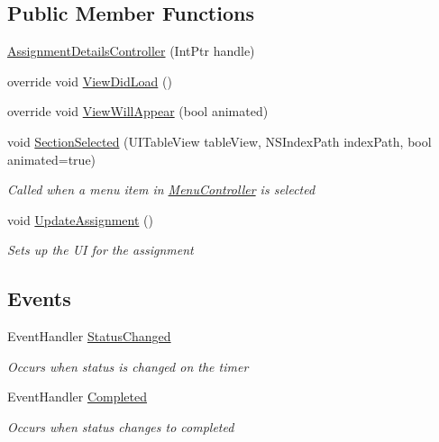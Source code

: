 \subsection*{Public Member Functions}
\begin{DoxyCompactItemize}
\item 
\hyperlink{class_field_service_1_1i_o_s_1_1_assignment_details_controller_a06faa2d417819881ae24d85e6d36aef0}{Assignment\+Details\+Controller} (Int\+Ptr handle)
\item 
override void \hyperlink{class_field_service_1_1i_o_s_1_1_assignment_details_controller_a4ee2c39c5958c7a07bcf1f37e794e79b}{View\+Did\+Load} ()
\item 
override void \hyperlink{class_field_service_1_1i_o_s_1_1_assignment_details_controller_afa9a33b6f985b8f081942c33626387e1}{View\+Will\+Appear} (bool animated)
\item 
void \hyperlink{class_field_service_1_1i_o_s_1_1_assignment_details_controller_a9142dec65b3188871903128680ad9a90}{Section\+Selected} (U\+I\+Table\+View table\+View, N\+S\+Index\+Path index\+Path, bool animated=true)
\begin{DoxyCompactList}\small\item\em Called when a menu item in \hyperlink{class_field_service_1_1i_o_s_1_1_menu_controller}{Menu\+Controller} is selected \end{DoxyCompactList}\item 
void \hyperlink{class_field_service_1_1i_o_s_1_1_assignment_details_controller_a2126c6fe1eab84b975224482951f2f5b}{Update\+Assignment} ()
\begin{DoxyCompactList}\small\item\em Sets up the U\+I for the assignment \end{DoxyCompactList}\end{DoxyCompactItemize}
\subsection*{Events}
\begin{DoxyCompactItemize}
\item 
Event\+Handler \hyperlink{class_field_service_1_1i_o_s_1_1_assignment_details_controller_afbf3477f419b5cf67a6daa8d7846b3ca}{Status\+Changed}
\begin{DoxyCompactList}\small\item\em Occurs when status is changed on the timer \end{DoxyCompactList}\item 
Event\+Handler \hyperlink{class_field_service_1_1i_o_s_1_1_assignment_details_controller_a04329412a85bbaa87a5bab2e0eab2d5a}{Completed}
\begin{DoxyCompactList}\small\item\em Occurs when status changes to completed \end{DoxyCompactList}\end{DoxyCompactItemize}
